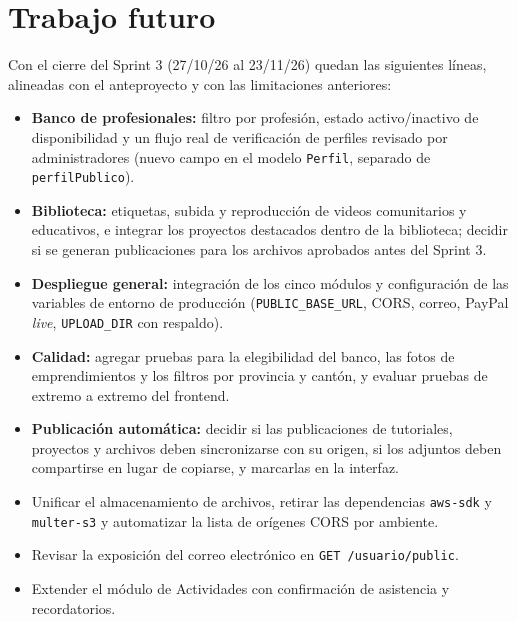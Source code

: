 \section{Trabajo futuro}
Con el cierre del Sprint 3 (27/10/26 al 23/11/26) quedan las siguientes líneas, alineadas con el anteproyecto y con las limitaciones anteriores:
\begin{itemize}
    \item \textbf{Banco de profesionales:} filtro por profesión, estado activo/inactivo de disponibilidad y un flujo real de verificación de perfiles revisado por administradores (nuevo campo en el modelo \texttt{Perfil}, separado de \texttt{perfilPublico}).
    \item \textbf{Biblioteca:} etiquetas, subida y reproducción de videos comunitarios y educativos, e integrar los proyectos destacados dentro de la biblioteca; decidir si se generan publicaciones para los archivos aprobados antes del Sprint 3.
    \item \textbf{Despliegue general:} integración de los cinco módulos y configuración de las variables de entorno de producción (\texttt{PUBLIC\_BASE\_URL}, CORS, correo, PayPal \textit{live}, \texttt{UPLOAD\_DIR} con respaldo).
    \item \textbf{Calidad:} agregar pruebas para la elegibilidad del banco, las fotos de emprendimientos y los filtros por provincia y cantón, y evaluar pruebas de extremo a extremo del frontend.
    \item \textbf{Publicación automática:} decidir si las publicaciones de tutoriales, proyectos y archivos deben sincronizarse con su origen, si los adjuntos deben compartirse en lugar de copiarse, y marcarlas en la interfaz.
    \item Unificar el almacenamiento de archivos, retirar las dependencias \texttt{aws-sdk} y \texttt{multer-s3} y automatizar la lista de orígenes CORS por ambiente.
    \item Revisar la exposición del correo electrónico en \texttt{GET /usuario/public}.
    \item Extender el módulo de Actividades con confirmación de asistencia y recordatorios.
\end{itemize}
